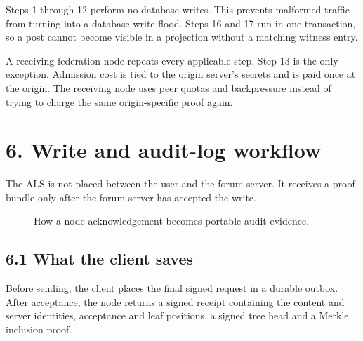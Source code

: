 \documentclass[12pt,a4paper]{article}
\begin{document}
Steps 1 through 12 perform no database writes. This prevents malformed traffic from turning into a database-write flood. Steps 16 and 17 run in one transaction, so a post cannot become visible in a projection without a matching witness entry.

A receiving federation node repeats every applicable step. Step 13 is the only exception. Admission cost is tied to the origin server's secrets and is paid once at the origin. The receiving node uses peer quotas and backpressure instead of trying to charge the same origin-specific proof again.

\section*{6. Write and audit-log workflow}
The ALS is not placed between the user and the forum server. It receives a proof bundle only after the forum server has accepted the write.


\begin{figure}[H]\centering
{}
\caption{How a node acknowledgement becomes portable audit evidence.}
\end{figure}
\subsection*{6.1 What the client saves}
Before sending, the client places the final signed request in a durable outbox. After acceptance, the node returns a signed receipt containing the content and server identities, acceptance and leaf positions, a signed tree head and a Merkle inclusion proof.
\end{document}
